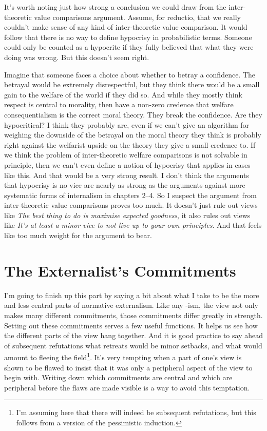 \documentclass[
  10pt,
  letterpaper,
  twoside]{scrbook}
\begin{document}
It's worth noting just how strong a conclusion we could draw from the
inter-theoretic value comparisons argument. Assume, for reductio, that
we really couldn't make sense of any kind of inter-theoretic value
comparison. It would follow that there is no way to define hypocrisy in
probabilistic terms. Someone could only be counted as a hypocrite if
they fully believed that what they were doing was wrong. But this
doesn't seem right.

Imagine that someone faces a choice about whether to betray a
confidence. The betrayal would be extremely disrespectful, but they
think there would be a small gain to the welfare of the world if they
did so. And while they mostly think respect is central to morality, then
have a non-zero credence that welfare consequentialism is the correct
moral theory. They break the confidence. Are they hypocritical? I think
they probably are, even if we can't give an algorithm for weighing the
downside of the betrayal on the moral theory they think is probably
right against the welfarist upside on the theory they give a small
credence to. If we think the problem of inter-theoretic welfare
comparisons is not solvable in principle, then we can't even define a
notion of hypocrisy that applies in cases like this. And that would be a
very strong result. I don't think the arguments that hypocrisy is no
vice are nearly as strong as the arguments against more systematic forms
of internalism in chapters 2--4. So I suspect the argument from
inter-theoretic value comparisons proves too much. It doesn't just rule
out views like \emph{The best thing to do is maximise expected
goodness}, it also rules out views like \emph{It's at least a minor vice
to not live up to your own principles}. And that feels like too much
weight for the argument to bear.

\section{The Externalist's
Commitments}\label{theexternalistscommitments}

I'm going to finish up this part by saying a bit about what I take to be
the more and less central parts of normative externalism. Like any -ism,
the view not only makes many different commitments, those commitments
differ greatly in strength. Setting out these commitments serves a few
useful functions. It helps us see how the different parts of the view
hang together. And it is good practice to say ahead of subsequent
refutations what retreats would be minor setbacks, and what would amount
to fleeing the field\footnote{I'm assuming here that there will indeed
  be subsequent refutations, but this follows from a version of the
  pessimistic induction.}. It's very tempting when a part of one's view
is shown to be flawed to insist that it was only a peripheral aspect of
the view to begin with. Writing down which commitments are central and
which are peripheral before the flaws are made visible is a way to avoid
this temptation.
\end{document}
